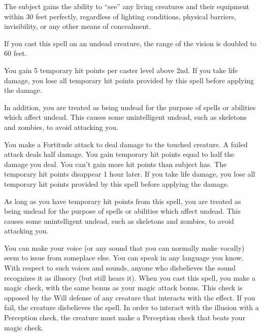 \spelldur{\durlong \dismissable}
\spelleffect The subject gains the ability to ``see'' any living creatures and their equipment within 30 feet perfectly, regardless of lighting conditions, physical barriers, invisibility, or any other means of concealment.

If you cast this spell on an undead creature, the range of the vision is doubled to 60 feet.

\spelldur{\durlong}
\spelleffect You gain 5 temporary hit points  per caster level above 2nd. If you take life damage, you lose all temporary hit points provided by this spell before applying the damage.

In addition, you are treated as being undead for the purpose of spells or abilities which affect undead. This causes some unintelligent undead, such as skeletons and zombies, to avoid attacking you.

\spelleffect You make a Fortitude attack to deal damage to the touched creature. A failed attack deals half damage. You gain temporary hit points equal to half the damage you deal. You can't gain more hit points than subject has. The temporary hit points disappear 1 hour later. If you take life damage, you lose all temporary hit points provided by this spell before applying the damage.

As long as you have temporary hit points from this spell, you are treated as being undead for the purpose of spells or abilities which affect undead. This causes some unintelligent undead, such as skeletons and zombies, to avoid attacking you.

\spellrng{\rngclose}
\spelldur{\durshort \dismissable}
\spelleffect You can make your voice (or any sound that you can normally make vocally) seem to issue from someplace else. You can speak in any language you know. With respect to such voices and sounds, anyone who disbelieves the sound recognizes it as illusory (but still hears it).
\spellnotes When you cast this spell, you make a magic check, with the same bonus as your magic attack bonus. This check is opposed by the Will defense of any creature that interacts with the effect. If you fail, the creature disbelieves the spell. In order to interact with the illusion with a Perception check, the creature must make a Perception check that beats your magic check.

